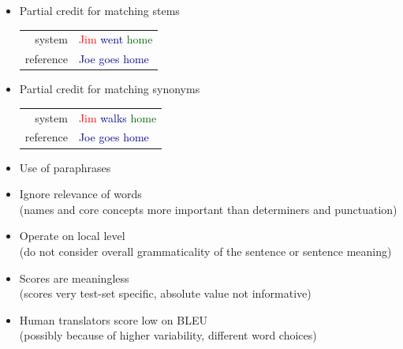 \documentclass[landscape]{slides}
\newcommand{\example}[1]{\textcolor{darkblue}{\rm #1}}
\begin{document}

\vspace{10mm}
\begin{itemize}
\item Partial credit for matching stems
\begin{center}
\begin{tabular}{rl}
{\sc system} & \example{\textcolor{red}{Jim} \textcolor{reddishgreen}{went} \textcolor{darkgreen}{home}}\\
{\sc reference} & \example{Joe goes home}\\
\end{tabular}
\end{center}
\item Partial credit for matching synonyms
\begin{center}
\begin{tabular}{rl}
{\sc system} & \example{\textcolor{red}{Jim} \textcolor{reddishgreen}{walks} \textcolor{darkgreen}{home}}\\
{\sc reference} & \example{Joe goes home}\\
\end{tabular}
\end{center}
\item Use of paraphrases
\end{itemize}


\vspace{10mm}
\begin{itemize}
\item Ignore relevance of words\\[3mm]
(names and core concepts more important than determiners and punctuation)
\item Operate on local level\\[3mm]
(do not consider overall grammaticality of the sentence or sentence meaning)
\item Scores are meaningless\\[3mm]
(scores very test-set specific, absolute value not informative)
\item Human translators score low on BLEU\\[3mm]
(possibly because of higher variability, different word choices)
\end{itemize}
\end{document}

